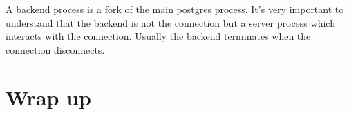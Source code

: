 A backend process is a fork of the main postgres process. It's very important to understand that the 
backend is not the connection but a server process which interacts with the connection. Usually the backend 
terminates when the connection disconnects. 


\section{Wrap up}

